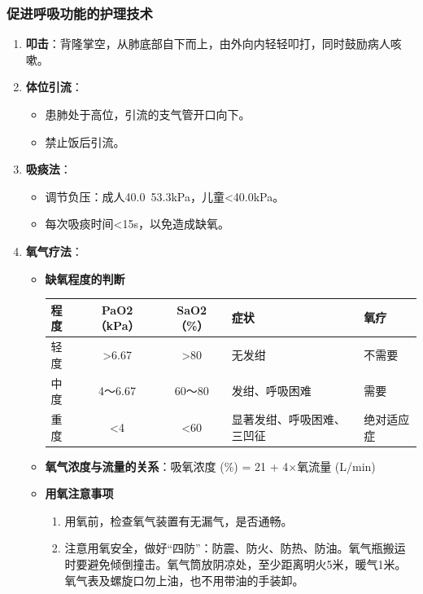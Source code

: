 \documentclass[11pt, a4paper]{ctexart}
\begin{document}
\subsubsection{促进呼吸功能的护理技术}
\begin{enumerate}
    \item \textbf{叩击}：背隆掌空，从肺底部自下而上，由外向内轻轻叩打，同时鼓励病人咳嗽。
    \item \textbf{体位引流}：
    \begin{itemize}
        \item 患肺处于高位，引流的支气管开口向下。
        \item 禁止饭后引流。
    \end{itemize}
    \item \textbf{吸痰法}：
    \begin{itemize}
        \item 调节负压：成人40.0~53.3kPa，儿童<40.0kPa。
        \item 每次吸痰时间<15s，以免造成缺氧。
    \end{itemize}
    \item \textbf{氧气疗法}：
    \begin{itemize}
        \item \textbf{缺氧程度的判断}
        \begin{table}[htbp]
        \centering
        \begin{tabular}{|l|c|c|l|l|}
        \hline
        \textbf{程度} & \textbf{PaO2（kPa）} & \textbf{SaO2（\%）} & \textbf{症状} & \textbf{氧疗} \\
        \hline
        轻度 & >6.67 & >80 & 无发绀 & 不需要 \\
        中度 & 4～6.67 & 60～80 & 发绀、呼吸困难 & 需要 \\
        重度 & <4 & <60 & 显著发绀、呼吸困难、三凹征 & 绝对适应症 \\
        \hline
        \end{tabular}
        \end{table}
        \item \textbf{氧气浓度与流量的关系}：吸氧浓度 (\%) = 21 + 4×氧流量 (L/min)
        \item \textbf{用氧注意事项}
        \begin{enumerate}
            \item 用氧前，检查氧气装置有无漏气，是否通畅。
            \item 注意用氧安全，做好“四防”：防震、防火、防热、防油。氧气瓶搬运时要避免倾倒撞击。氧气筒放阴凉处，至少距离明火5米，暖气1米。氧气表及螺旋口勿上油，也不用带油的手装卸。

\end{enumerate}
\end{itemize}
\end{enumerate}
\end{document}
